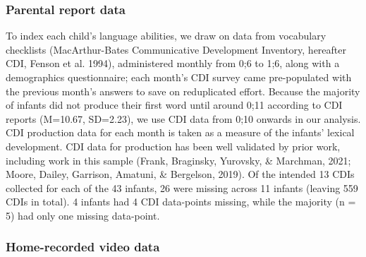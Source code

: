 \documentclass[
  man,mask,floatsintext]{apa6}
\begin{document}
\hypertarget{parental-report-data}{%
\subsubsection{Parental report data}\label{parental-report-data}}

To index each child's language abilities, we draw on data from vocabulary checklists (MacArthur-Bates Communicative Development Inventory, hereafter CDI, Fenson et al. 1994), administered monthly from 0;6 to 1;6, along with a demographics questionnaire; each month's CDI survey came pre-populated with the previous month's answers to save on reduplicated effort. Because the majority of infants did not produce their first word until around 0;11 according to CDI reports (M=10.67, SD=2.23), we use CDI data from 0;10 onwards in our analysis. CDI production data for each month is taken as a measure of the infants' lexical development. CDI data for production has been well validated by prior work, including work in this sample (Frank, Braginsky, Yurovsky, \& Marchman, 2021; Moore, Dailey, Garrison, Amatuni, \& Bergelson, 2019). Of the intended 13 CDIs collected for each of the 43 infants, 26 were missing across 11 infants (leaving 559 CDIs in total). 4 infants had 4 CDI data-points missing, while the majority (n = 5) had only one missing data-point.

\hypertarget{home-recorded-video-data}{%
\subsubsection{Home-recorded video data}\label{home-recorded-video-data}}
\end{document}

